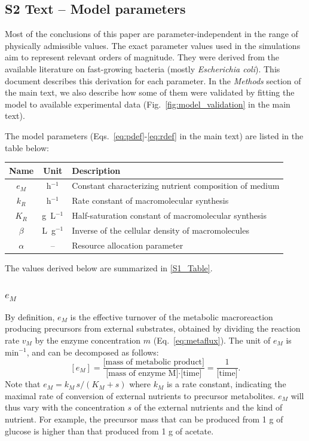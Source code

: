 \clearpage

\subsection{S2 Text -- Model parameters}

Most of the conclusions of this paper are parameter-independent in the range of physically admissible values.
The exact parameter values used in the simulations aim to represent relevant orders of magnitude.
They were derived from the available literature on fast-growing bacteria (mostly \textit{Escherichia coli}).
This document describes this derivation for each parameter.
In the \textit{Methods} section of the main text, we also describe how some of them were validated by fitting the model to available experimental data (Fig.~\ref{fig:model_validation} in the main text).

The model parameters (Eqs.~\ref{eq:pdef}-\ref{eq:rdef} in the main text) are listed in the table below:
\begin{center}
\begin{tabular}{|c|c|l|}
\hline
Name & Unit & Description \\
\hline
$e_M$ & h$^{-1}$ & Constant characterizing nutrient composition of medium\\
\hline
$k_R$ & h$^{-1}$ & Rate constant of macromolecular synthesis\\
\hline
$K_R$ & g\ L$^{-1}$ & Half-saturation constant of macromolecular synthesis\\
\hline
$\beta$ & L\ g$^{-1}$ & Inverse of the cellular density of macromolecules\\
\hline
$\alpha$ & -- & Resource allocation parameter\\
\hline
\end{tabular}
\end{center}
The values derived below are summarized in \ref{S1_Table}.


\subsubsection{\Large \texorpdfstring{$e_M$}{eM}}

By definition, $e_M$ is the effective turnover of the metabolic macroreaction producing precursors from external substrates, obtained by dividing the reaction rate $v_M$ by the enzyme concentration $m$ (Eq.~\ref{eq:metaflux}).
The unit of $e_M$ is min$^{-1}$, and can be decomposed as follows:
\[
[e_M]  = \frac{\text{[mass of metabolic product]}}{\text{[mass of enzyme M]}\cdot \text{[time]}} = \frac{1}{\text{[time]}}.
\]
Note that $e_M = k_M\, s / (K_M + s)$ where $k_M$ is a rate constant, indicating the maximal rate of conversion of external nutrients to precursor metabolites. 
$e_M$ will thus vary with the concentration $s$ of the external nutrients and the kind of nutrient. 
For example, the precursor mass that can be produced from 1 g of glucose is higher than that produced from 1 g of acetate.

